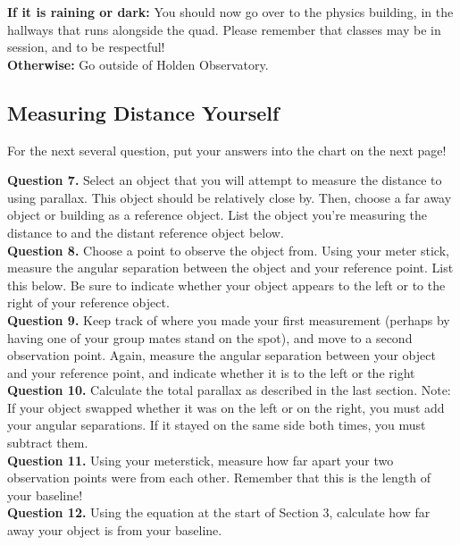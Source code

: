 \documentclass[11pt]{article}
\begin{document}
\textbf{If it is raining or dark:} You should now go over to the physics building, in the hallways that runs alongside the quad. Please remember that classes may be in session, and to be respectful!\\

\textbf{Otherwise:} Go outside of Holden Observatory.

\newpage

\subsection{Measuring Distance Yourself}
For the next several question, put your answers into the chart on the next page!

\textbf{Question 7.} Select an object that you will attempt to measure the distance to using parallax. This object should be relatively close by. Then, choose a far away object or building as a reference object. List the object you're measuring the distance to and the distant reference object below.\\

\textbf{Question 8.} Choose a point to observe the object from. Using your meter stick, measure the angular separation between the object and your reference point. List this below. Be sure to indicate whether your object appears to the left or to the right of your reference object.\\

\textbf{Question 9.} Keep track of where you made your first measurement (perhaps by having one of your group mates stand on the spot), and move to a second observation point. Again, measure the angular separation between your object and your reference point, and indicate whether it is to the left or the right\\

\textbf{Question 10.} Calculate the total parallax as described in the last section. Note: If your object swapped whether it was on the left or on the right, you must add your angular separations. If it stayed on the same side both times, you must subtract them.\\

\textbf{Question 11.} Using your meterstick, measure how far apart your two observation points were from each other. Remember that this is the length of your baseline!\\

\textbf{Question 12.} Using the equation at the start of Section 3, calculate how far away your object is from your baseline.\\
\end{document}
